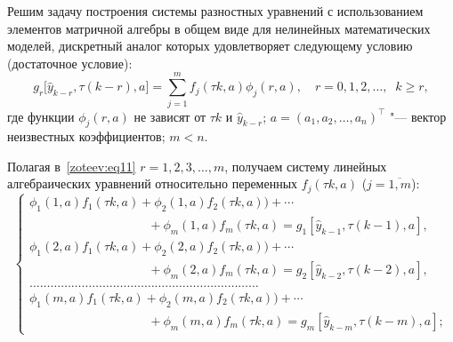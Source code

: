 Решим задачу построения системы разностных уравнений с использованием элементов матричной алгебры в общем виде для нелинейных математических моделей, дискретный аналог которых удовлетворяет следующему условию (достаточное условие):
\begin{equation}
g_r\big[\hat{y}_{k-r},\tau(k-r),a\big]=\sum_{j=1}^m f_j(\tau k, a)\phi_j(r,a), \quad r=0,1,2,\dots, \; \; k \geq r,
\label{zoteev:eq11}
\end{equation}
где функции $\phi_j(r,a)$ не зависят от $\tau k$ и $\hat{y}_{k-r}$; $a=(a_1,a_2,\dots,a_n)^{\top}$ "--- вектор неизвестных коэффициентов; $m<n$.

Полагая в~\eqref{zoteev:eq11} $r=1,2,3,\dots,m$, получаем систему линейных алгебраических уравнений относительно переменных $f_j(\tau k,a)$ ($j=\overline{1,m}$):  
\begin{equation}
\left\{
\begin{array}{l}
\phi_1(1,a)f_1(\tau k,a)+\phi_2(1,a)f_2(\tau k,a))+\cdots \\
\hspace{4cm} +\phi_m(1,a)f_m(\tau k,a)= g_1[\hat {y}_{k-1},\tau(k-1),a],\\[2mm]
\phi_1(2,a)f_1(\tau k,a)+\phi_2(2,a)f_2(\tau k,a))+\cdots \\ 
\hspace{4cm} +\phi_m(2,a)f_m(\tau k,a) =g_2[\hat{y}_{k-2},\tau(k-2),a],\\[2mm]
\dots\dots\dots\dots\dots\dots\dots\dots\dots\dots
\dots\dots\dots\dots\dots\dots\dots\dots\dots\dots \dots \dots
\\[2mm]
\phi_1(m,a)f_1(\tau k,a)+\phi_2(m,a)f_2(\tau k,a))+\cdots\\
\hspace{4cm} +\phi_m(m,a)f_m(\tau k,a) =g_m[\hat{y}_{k-m},\tau(k-m),a];
\label{zoteev:eq12}
\end{array}
\right.
\end{equation}

